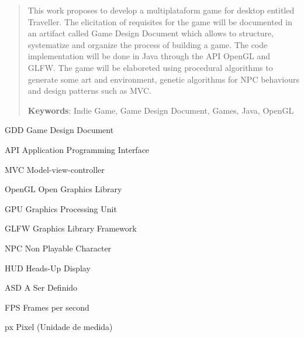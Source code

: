 \documentclass[12pt, 
openright, 
oneside, 
a4paper,    
brazil]{facom-ufu-abntex2}
\begin{document}
\begin{abstract} 
This work proposes to develop a multiplataform game for desktop entitled Traveller. The elicitation of requisites for the game will be documented in an artifact called Game Design Document which allows to structure, systematize and organize the process of building a game. The code implementation will be done in Java through the API OpenGL and GLFW.  The game will be elaboreted using procedural algorithms to generate some art and environment, genetic algorithms for NPC behaviours and design patterns such as MVC.

 \vspace{\onelineskip}
    
 \noindent
 \textbf{Keywords}: Indie Game, Game Design Document, Games, Java, OpenGL %
\end{abstract}
\cleardoublepage


\listoffigures*
\cleardoublepage


\listoftables*
\cleardoublepage

\lstlistoflistings
\cleardoublepage


\begin{siglas} 
  \item[GDD] Game Design Document 
  \item[API] Application Programming Interface
  \item[MVC] Model-view-controller
  \item[OpenGL] Open Graphics Library
  \item[GPU] Graphics Processing Unit
  \item[GLFW] Graphics Library Framework
  \item[NPC] Non Playable Character
  \item[HUD] Heads-Up Display
  \item[ASD] A Ser Definido
  \item[FPS] Frames per second
  \item[px] Pixel (Unidade de medida)
\end{siglas}
\end{document}
